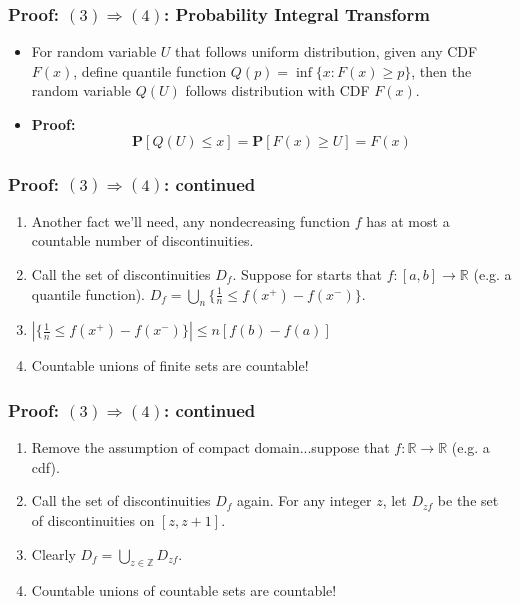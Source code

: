 \documentclass[handout]{beamer}
\newcommand{\BP}{\mathbf{P}}
\begin{document}
        




\frame
{
  \frametitle{Proof: $(3) \Rightarrow (4)$:  Probability Integral Transform} 

\begin{itemize}

\item<1->[-] For random variable $U$ that follows uniform distribution, given any CDF $F(x)$, define quantile function $Q(p)=\inf \{x: F(x) \geq p\}$, then the random variable $Q(U)$ follows distribution with CDF $F(x)$. 


\item<2->[-] \textbf{Proof:} $$\BP[Q(U)\leq x] =\BP [F(x) \geq U]=F(x)$$

\end{itemize}


}





\frame
{
  \frametitle{Proof: $(3) \Rightarrow (4)$: continued} 


\begin{enumerate}
                   
\item Another fact we'll need, any nondecreasing function $f$ has at most a countable number of discontinuities. 

\item Call the set of discontinuities $D_f$. Suppose for starts that $f : [a,b] \to \mathbb{R}$ (e.g. a quantile function).  $D_f = \bigcup_{n} \{  \frac{1}{n} \le  f(x^+) - f(x^-) \}$.

\item $|\{  \frac{1}{n} \le  f(x^+) - f(x^-) \}| \le n [f(b) - f(a)]$

\item Countable unions of finite sets are countable!


\end{enumerate}
}


\frame
{
  \frametitle{Proof: $(3) \Rightarrow (4)$: continued} 


\begin{enumerate}
                   
\item Remove the assumption of compact domain...suppose that $f : \mathbb{R} \to \mathbb{R}$ (e.g. a cdf).

\item Call the set of discontinuities $D_f$ again.  For any integer $z$, let $D_{zf}$ be the set of discontinuities on $[z,z+1]$. 

\item Clearly $D_f = \bigcup_{z \in \mathbb{Z}} D_{zf}$.

\item Countable unions of countable sets are countable!

\end{enumerate}
}
\end{document}
